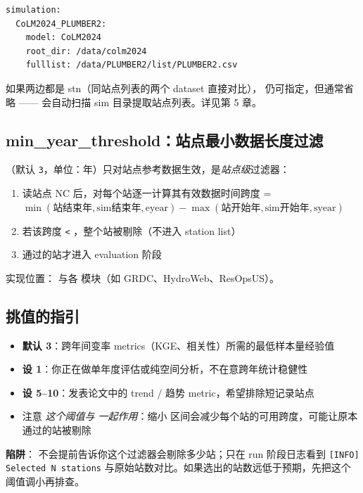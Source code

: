 \begin{verbatim}
simulation:
  CoLM2024_PLUMBER2:
    model: CoLM2024
    root_dir: /data/colm2024
    fulllist: /data/PLUMBER2/list/PLUMBER2.csv
\end{verbatim}

如果两边都是 stn（同站点列表的两个 dataset 直接对比）， 仍可指定，但通常省略 —— \openbench{} 会自动扫描 sim 目录提取站点列表。详见第 5 章。

\subsection{min\_year\_threshold：站点最小数据长度过滤}

（默认 \texttt{3}，单位：年）只对站点参考数据生效，是\emph{站点级}过滤器：

\begin{enumerate}
  \item \openbench{} 读站点 NC 后，对每个站逐一计算其有效数据时间跨度 = $\min(\text{站结束年}, \text{sim结束年}, \text{eyear}) - \max(\text{站开始年}, \text{sim开始年}, \text{syear})$
  \item 若该跨度 \texttt{<} ，整个站被剔除（不进入 station list）
  \item 通过的站才进入 evaluation 阶段
\end{enumerate}

实现位置： 与各  模块（如 GRDC、HydroWeb、ResOpsUS）。

\subsection*{挑值的指引}

\begin{itemize}
  \item \textbf{默认 3}：跨年间变率 metrics（KGE、相关性）所需的最低样本量经验值
  \item \textbf{设 1}：你正在做单年度评估或纯空间分析，不在意跨年统计稳健性
  \item \textbf{设 5--10}：发表论文中的 trend / 趋势 metric，希望排除短记录站点
  \item 注意 \emph{这个阈值与  一起作用}：缩小  区间会减少每个站的可用跨度，可能让原本通过的站被剔除
\end{itemize}

\textbf{陷阱}： 不会提前告诉你这个过滤器会剔除多少站；只在 run 阶段日志看到 \texttt{[INFO] Selected N stations} 与原始站数对比。如果选出的站数远低于预期，先把这个阈值调小再排查。

